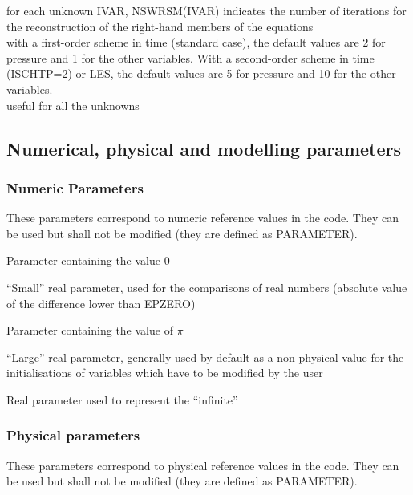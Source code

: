 {for each unknown IVAR, NSWRSM(IVAR) indicates the number of iterations for the
reconstruction of the right-hand members of the equations\\ 
with a first-order scheme in time
(standard case), the default values are 2 for pressure and 1 for the
other variables. With a second-order scheme in time (ISCHTP=2) or LES, the
default values are 5 for pressure and 10 for the other variables.\\
useful for all the unknowns}


\subsection{Numerical, physical and modelling parameters}
\subsubsection{Numeric Parameters}

These parameters correspond to numeric reference values in the code.
They can be used but shall not be modified (they are defined as PARAMETER).

{Parameter containing the value 0}

{``Small'' real parameter, used for the comparisons of real numbers (absolute
value of the difference lower than EPZERO)}

{Parameter containing the value of $\pi$}
 
{``Large'' real parameter, generally used by default as a non physical value for
the initialisations of variables which have to be modified by the user}

{Real parameter used to represent the ``infinite''}

\subsubsection{Physical parameters}
These parameters correspond to physical reference values in the code.
They can be used but shall not be modified (they are defined as PARAMETER).

